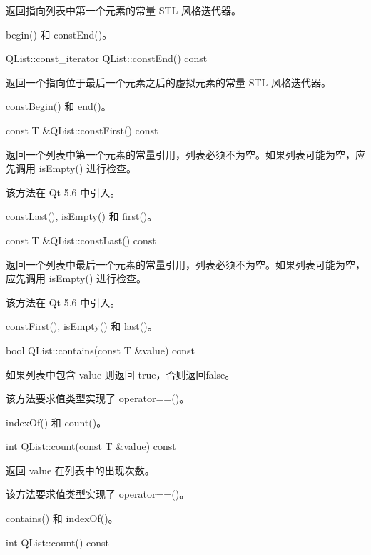 返回指向列表中第一个元素的常量 STL 风格迭代器。


\begin{notice}[另请参阅]
begin() 和 constEnd()。
\end{notice}


QList::const\_iterator QList::constEnd() const

返回一个指向位于最后一个元素之后的虚拟元素的常量 STL 风格迭代器。




\begin{notice}[另请参阅]
constBegin() 和 end()。
\end{notice}


const T \&QList::constFirst() const

返回一个列表中第一个元素的常量引用，列表必须不为空。如果列表可能为空，应先调用 isEmpty() 进行检查。

该方法在 Qt 5.6 中引入。

\begin{notice}[另请参阅]
constLast(), isEmpty() 和 first()。
\end{notice}


const T \&QList::constLast() const

返回一个列表中最后一个元素的常量引用，列表必须不为空。如果列表可能为空，应先调用 isEmpty() 进行检查。

该方法在 Qt 5.6 中引入。




\begin{notice}[另请参阅]
constFirst(), isEmpty() 和 last()。
\end{notice}


bool QList::contains(const T \&value) const

如果列表中包含 value 则返回 true，否则返回false。

该方法要求值类型实现了 operator==()。

\begin{notice}[另请参阅]
indexOf() 和 count()。
\end{notice}

int QList::count(const T \&value) const

返回 value 在列表中的出现次数。

该方法要求值类型实现了 operator==()。



\begin{notice}[另请参阅]
contains() 和 indexOf()。
\end{notice}


int QList::count() const


